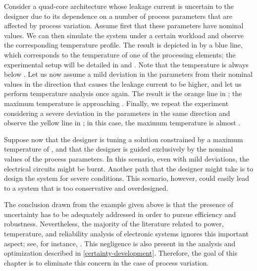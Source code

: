 Consider a quad-core architecture whose leakage current is uncertain to the
designer due to its dependence on a number of process parameters that are
affected by process variation. Assume first that these parameters have nominal
values. We can then simulate the system under a certain workload and observe the
corresponding temperature profile. The result is depicted in
 by a blue line, which corresponds to the temperature of
one of the processing elements; the experimental setup will be detailed in
 and . Note that
the temperature is always below . Let us now assume a mild deviation
in the parameters from their nominal values in the direction that causes the
leakage current to be higher, and let us perform temperature analysis once
again. The result is the orange line in ; the maximum
temperature is approaching . Finally, we repeat the experiment
considering a severe deviation in the parameters in the same direction and
observe the yellow line in ; in this case, the maximum
temperature is almost .

Suppose now that the designer is tuning a solution constrained by a maximum
temperature of , and that the designer is guided exclusively by the
nominal values of the process parameters. In this scenario, even with mild
deviations, the electrical circuits might be burnt. Another path that the
designer might take is to design the system for severe conditions. This
scenario, however, could easily lead to a system that is too conservative and
overdesigned.

The conclusion drawn from the example given above is that the presence of
uncertainty has to be adequately addressed in order to pursue efficiency and
robustness. Nevertheless, the majority of the literature related to power,
temperature, and reliability analysis of electronic systems ignores this
important aspect; see, for instance, \cite{rao2009, yang2010, rai2011,
thiele2011, pagani2014}. This negligence is also present in the analysis and
optimization described in \cref{certainty-development}. Therefore, the goal of
this chapter is to eliminate this concern in the case of process variation.
